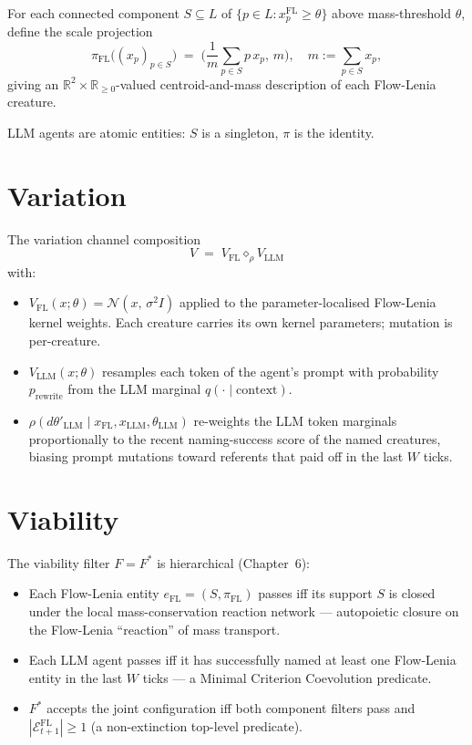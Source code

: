 For each connected component $S \subseteq L$ of $\{p \in L :
x^{\mathrm{FL}}_p \geq \theta\}$ above mass-threshold $\theta$, define
the scale projection
\[
  \pi_{\mathrm{FL}}\!\big((x_p)_{p \in S}\big) \;=\;
  \Big(\frac{1}{m}\sum_{p \in S} p\, x_p,\, m\Big), \quad
  m := \sum_{p \in S} x_p,
\]
giving an $\mathbb{R}^2 \times \mathbb{R}_{\geq 0}$-valued
centroid-and-mass description of each Flow-Lenia creature.

LLM agents are atomic entities: $S$ is a singleton, $\pi$ is the
identity.

\section{Variation}

The variation channel composition
\[
  V \;=\; V_{\mathrm{FL}} \diamond_\rho V_{\mathrm{LLM}}
\]
with:

\begin{itemize}[leftmargin=1.5em,itemsep=2pt]
  \item $V_{\mathrm{FL}}(x;\theta) = \mathcal{N}(x,\, \sigma^2 I)$
    applied to the parameter-localised Flow-Lenia kernel weights. Each
    creature carries its own kernel parameters; mutation is
    per-creature.
  \item $V_{\mathrm{LLM}}(x;\theta)$ resamples each token of the
    agent's prompt with probability $p_{\mathrm{rewrite}}$ from the
    LLM marginal $q(\cdot \mid \mathrm{context})$.
  \item $\rho(d\theta'_{\mathrm{LLM}} \mid x_{\mathrm{FL}},
    x_{\mathrm{LLM}}, \theta_{\mathrm{LLM}})$ re-weights the LLM token
    marginals proportionally to the recent naming-success score of
    the named creatures, biasing prompt mutations toward referents
    that paid off in the last $W$ ticks.
\end{itemize}

\section{Viability}

The viability filter $F = F^*$ is hierarchical (Chapter~6):

\begin{itemize}[leftmargin=1.5em,itemsep=2pt]
  \item Each Flow-Lenia entity $e_{\mathrm{FL}} = (S, \pi_{\mathrm{FL}})$
    passes iff its support $S$ is closed under the local
    mass-conservation reaction network --- autopoietic closure on the
    Flow-Lenia ``reaction'' of mass transport.
  \item Each LLM agent passes iff it has successfully named at least
    one Flow-Lenia entity in the last $W$ ticks --- a Minimal
    Criterion Coevolution predicate.
  \item $F^*$ accepts the joint configuration iff both component
    filters pass and $|\mathcal{E}_{t+1}^{\mathrm{FL}}| \geq 1$ (a
    non-extinction top-level predicate).
\end{itemize}

